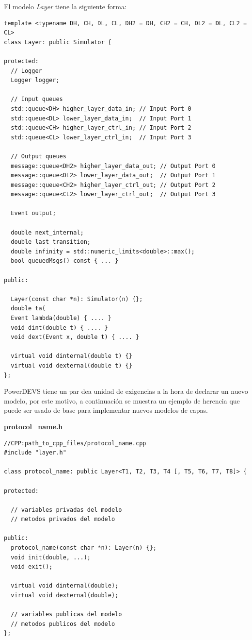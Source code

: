 \documentclass[10pt,a4paper]{article}
\begin{document}
El modelo \textit{Layer} tiene la siguiente forma:
\begin{lstlisting}
template <typename DH, CH, DL, CL, DH2 = DH, CH2 = CH, DL2 = DL, CL2 = CL>
class Layer: public Simulator { 

protected:
  // Logger
  Logger logger;

  // Input queues
  std::queue<DH> higher_layer_data_in; // Input Port 0
  std::queue<DL> lower_layer_data_in;  // Input Port 1
  std::queue<CH> higher_layer_ctrl_in; // Input Port 2 
  std::queue<CL> lower_layer_ctrl_in;  // Input Port 3
  
  // Output queues
  message::queue<DH2> higher_layer_data_out; // Output Port 0 
  message::queue<DL2> lower_layer_data_out;  // Output Port 1
  message::queue<CH2> higher_layer_ctrl_out; // Output Port 2
  message::queue<CL2> lower_layer_ctrl_out;  // Output Port 3

  Event output;

  double next_internal;
  double last_transition;
  double infinity = std::numeric_limits<double>::max();
  bool queuedMsgs() const { ... }

public:

  Layer(const char *n): Simulator(n) {};
  double ta(
  Event lambda(double) { .... }
  void dint(double t) { .... }
  void dext(Event x, double t) { .... }
  
  virtual void dinternal(double t) {}
  virtual void dexternal(double t) {}
};
\end{lstlisting}

PowerDEVS tiene un par dea unidad de exigencias a la hora de declarar un nuevo modelo, por este motivo, a continuación se muestra un ejemplo de herencia que puede ser usado de base para implementar nuevos modelos de capas. \\

\newpage

\textbf{protocol\_name.h}
\begin{lstlisting}
//CPP:path_to_cpp_files/protocol_name.cpp
#include "layer.h"

class protocol_name: public Layer<T1, T2, T3, T4 [, T5, T6, T7, T8]> { 

protected:
	
  // variables privadas del modelo
  // metodos privados del modelo

public:
  protocol_name(const char *n): Layer(n) {};
  void init(double, ...);
  void exit();

  virtual void dinternal(double);
  virtual void dexternal(double);
  
  // variables publicas del modelo
  // metodos publicos del modelo
};
\end{lstlisting}
\end{document}
